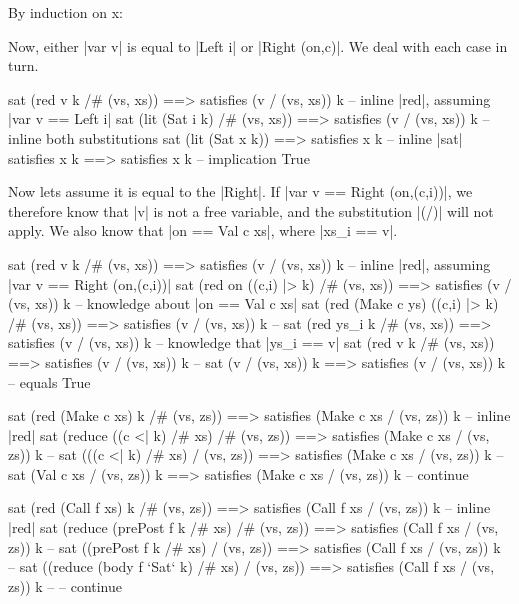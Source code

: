 By induction on x:


Now, either |var v| is equal to |Left i| or |Right (on,c)|. We deal with each case in turn.

\begin{code}
sat (red v k /# (vs, xs)) ==> satisfies (v / (vs, xs)) k
    -- inline |red|, assuming |var v == Left i|
sat (lit (Sat i k) /# (vs, xs)) ==> satisfies (v / (vs, xs)) k
    -- inline both substitutions
sat (lit (Sat x k)) ==> satisfies x k
    -- inline |sat|
satisfies x k ==> satisfies x k
    -- implication
True
\end{code}

Now lets assume it is equal to the |Right|. If |var v == Right (on,(c,i))|, we therefore know that |v| is not a free variable, and the substitution |(/)| will not apply. We also know that |on == Val c xs|, where |xs_i == v|.

\begin{code}
sat (red v k /# (vs, xs)) ==> satisfies (v / (vs, xs)) k
    -- inline |red|, assuming |var v == Right (on,(c,i))|
sat (red on ((c,i) |> k) /# (vs, xs)) ==> satisfies (v / (vs, xs)) k
    -- knowledge about |on == Val c xs|
sat (red (Make c ys) ((c,i) |> k) /# (vs, xs)) ==> satisfies (v / (vs, xs)) k
    -- \lemma{| ||> |}
sat (red ys_i k /# (vs, xs)) ==> satisfies (v / (vs, xs)) k
    -- knowledge that |ys_i == v|
sat (red v k /# (vs, xs)) ==> satisfies (v / (vs, xs)) k
    -- 
sat (v / (vs, xs)) k ==> satisfies (v / (vs, xs)) k
    -- equals
True
\end{code}


\begin{code}
sat (red (Make c xs) k /# (vs, zs)) ==> satisfies (Make c xs / (vs, zs)) k
    -- inline |red|
sat (reduce ((c <| k) /# xs) /# (vs, zs)) ==> satisfies (Make c xs / (vs, zs)) k
    -- 
sat (((c <| k) /# xs) / (vs, zs)) ==> satisfies (Make c xs / (vs, zs)) k
    -- 
sat (Val c xs / (vs, zs)) k ==> satisfies (Make c xs / (vs, zs)) k
    -- continue
\end{code}


\begin{code}
sat (red (Call f xs) k /# (vs, zs)) ==> satisfies (Call f xs / (vs, zs)) k
    -- inline |red|
sat (reduce (prePost f k /# xs) /# (vs, zs)) ==> satisfies (Call f xs / (vs, zs)) k
    -- 
sat ((prePost f k /# xs) / (vs, zs)) ==> satisfies (Call f xs / (vs, zs)) k
    -- 
sat ((reduce (body f `Sat` k) /# xs) / (vs, zs)) ==> satisfies (Call f xs / (vs, zs)) k
    -- 
    -- continue
\end{code}

